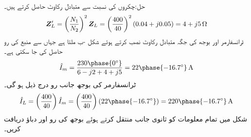 حل:چکروں کی نسبت  سے متبادل رکاوٹ حاصل کرتے ہیں۔
\begin{align*}
{\ensuremath{{\boldsymbol{Z}}}}_L'=\left(\frac{N_1}{N_2}\right)^2{{\boldsymbol{Z}}}_L=\left(\frac{400}{40}\right)^2 (0.04+j0.05)=4+j5 \, \si{\ohm}
\end{align*}
ٹرانسفارمر اور بوجھ کی جگہ متبادل رکاوٹ نصب کرتے ہوئے شکل -ب ملتا ہے جہاں سے منبع کی رو حاصل کی جا سکتی ہے۔
\begin{align*}
\hat{I}_m=\frac{230\phase{0^{\circ}}}{6-j2+4+j5}=22\phase{-16.7^{\circ}}\,\si{\ampere}
\end{align*}
ٹرانسفارمر کی بوجھ جانب رو درج ذیل ہو گی۔
\begin{align*}
\hat{I}_L=\left(\frac{400}{40}\right)\hat{I}_m=\left(\frac{400}{40}\right)(22\phase{-16.7^{\circ}})=220\phase{-16.7^{\circ}} \, \si{\ampere}
\end{align*}
شکل  میں تمام معلومات کو ثانوی جانب منتقل کرتے ہوئے بوجھ کی رو اور دباؤ دریافت کریں۔


